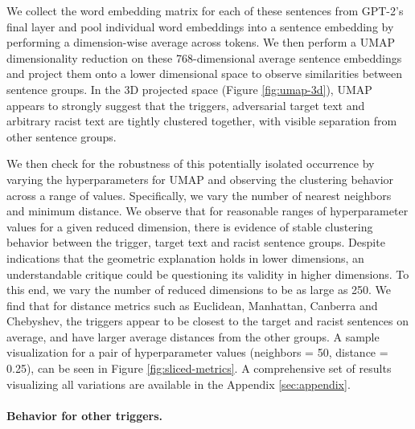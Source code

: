 \documentclass{article}
\theoremstyle{plain}
\theoremstyle{definition}
\theoremstyle{remark}
\begin{document}
We collect the word embedding matrix for each of these sentences from GPT-2's final layer and pool individual word embeddings into a sentence embedding by performing a dimension-wise average across tokens. We then perform a UMAP dimensionality reduction on these 768-dimensional average sentence embeddings and project them onto a lower dimensional space to observe similarities between sentence groups. In the 3D projected space (Figure \ref{fig:umap-3d}), UMAP appears to strongly suggest that the triggers, adversarial target text and arbitrary racist text are tightly clustered together, with visible separation from other sentence groups. 

We then check for the robustness of this potentially isolated occurrence by varying the hyperparameters for UMAP and observing the clustering behavior across a range of values. Specifically, we vary the number of nearest neighbors and minimum distance. We observe that for reasonable ranges of hyperparameter values for a given reduced dimension, there is evidence of stable clustering behavior between the trigger, target text and racist sentence groups. Despite indications that the geometric explanation holds in lower dimensions, an understandable critique could be questioning its validity in higher dimensions. To this end, we vary the number of reduced dimensions to be as large as 250. We find that for distance metrics such as Euclidean, Manhattan, Canberra and Chebyshev, the triggers appear to be closest to the target and racist sentences on average, and have larger average distances from the other groups. A sample visualization for a pair of hyperparameter values (neighbors = 50, distance = 0.25), can be seen in Figure \ref{fig:sliced-metrics}. A comprehensive set of results visualizing all variations are available in the Appendix \ref{sec:appendix}. 

\paragraph{Behavior for other triggers.}
\end{document}
